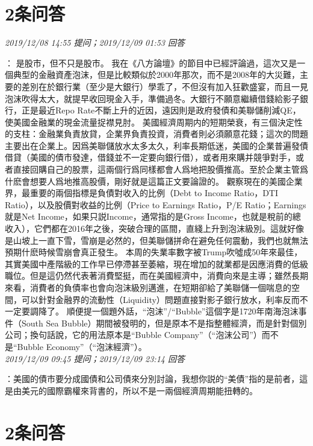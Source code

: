 \documentclass[twocolumn]{ctexart}
\begin{document}
\section{2条问答}

\textit{\hfill\noindent\small 2019/12/08 14:55 提问；2019/12/09 01:53 回答}

：
是股市，但不只是股市。 
我在《八方論壇》的節目中已經評論過，這次又是一個典型的金融資產泡沫，但是比較類似於2000年那次，而不是2008年的大災難，主要的差別在於銀行業（至少是大銀行）學乖了，不但沒有加入狂歡盛宴，而且一見泡沫吹得太大，就提早收回現金入手，準備過冬。大銀行不願意繼續借錢給影子銀行，正是最近Repo Rate不斷上升的近因，遠因則是政府發債和美聯儲削減QE，使美國金融業的現金流量捉襟見肘。 
美國經濟周期内的短期榮衰，有三個決定性的支柱：金融業負責放貸，企業界負責投資，消費者則必須願意花錢；這次的問題主要出在企業上。因爲美聯儲放水太多太久，利率長期低迷，美國的企業普遍發債借貸（美國的債市發達，借錢並不一定要向銀行借），或者用來購并競爭對手，或者直接回購自己的股票，這兩個行爲同樣都會人爲地把股價推高。至於企業主管爲什麽會想要人爲地推高股價，剛好就是這篇正文要論證的。 
觀察現在的美國企業界，最重要的兩個指標是負債對收入的比例（Debt to Income Ratio，DTI Ratio），以及股價對收益的比例（Price to Earnings Ratio，P/E Ratio；Earnings就是Net Income，如果只説Income，通常指的是Gross Income，也就是稅前的總收入），它們都在2016年之後，突破合理的區間，直綫上升到泡沫級別。這就好像是山坡上一直下雪，雪崩是必然的，但美聯儲拼命在避免任何震動，我們也就無法預期什麽時候雪崩會真正發生。 
本周的失業率數字被Trump吹噓成50年來最佳，其實美國中產階級的工作早已停滯甚至萎縮，現在增加的就業都是因應消費的低級職位。但是這仍然代表著消費堅挺，而在美國經濟中，消費向來是主導；雖然長期來看，消費者的負債率也會向泡沫級別邁進，在短期卻給了美聯儲一個喘息的空間，可以針對金融界的流動性（Liquidity）問題直接對影子銀行放水，利率反而不一定要調降了。 
順便提一個題外話，“泡沫”/“Bubble”這個字是1720年南海泡沫事件（South Sea Bubble）期間被發明的，但是原本不是指整體經濟，而是針對個別公司；換句話說，它的用法原本是“Bubble Company”（“泡沫公司”）而不是“Bubble Economy”（“泡沫經濟”）。
\\

\textit{\hfill\noindent\small 2019/12/09 09:45 提问；2019/12/09 23:14 回答}

：美國的債市要分成國債和公司債來分別討論，我想你説的“美債”指的是前者，這是由美元的國際霸權來背書的，所以不是一兩個經濟周期能扭轉的。
\\

\section{2条问答}
\end{document}
